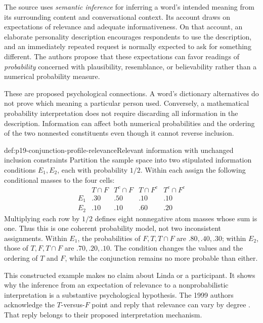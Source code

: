 The source uses \emph{semantic inference} for inferring a word's
intended meaning from its surrounding content and conversational
context. Its account draws on expectations of relevance and adequate
informativeness. On that account, an elaborate personality description
encourages respondents to use the description, and an immediately
repeated request is normally expected to ask for something different.
The authors propose that these expectations can favor readings of
\emph{probability} concerned with plausibility, resemblance, or
believability rather than a numerical probability measure.

These are proposed psychological connections. A word's dictionary
alternatives do not prove which meaning a particular person used.
Conversely, a mathematical probability interpretation does not require
discarding all information in the description. Information can affect
both numerical probabilities and the ordering of the two nonnested
constituents even though it cannot reverse inclusion.

\begin{hbexample}{def:p19-conjunction-profile-relevance}{Relevant information with unchanged inclusion constraints}
Partition the sample space into two stipulated information conditions
\(E_1,E_2\), each with probability \(1/2\). Within each assign the following
conditional masses to the four cells:
\[
\begin{array}{c|rrrr}
 &T\cap F&T^c\cap F&T\cap F^c&T^c\cap F^c\\ \hline
 E_1&.30&.50&.10&.10\\
 E_2&.10&.10&.60&.20
\end{array}
\]
Multiplying each row by \(1/2\) defines eight nonnegative atom masses
whose sum is one. Thus this is one coherent probability model, not
two inconsistent assignments.
Within \(E_1\), the probabilities of \(F,T,T\cap F\) are
\(.80,.40,.30\); within \(E_2\), those of \(T,F,T\cap F\)
are \(.70,.20,.10\). The condition changes the values and the
ordering of \(T\) and \(F\), while the conjunction remains no more
probable than either.

This constructed example makes no claim about Linda or a participant.
It shows why the inference from an expectation of relevance to a
nonprobabilistic interpretation is a substantive psychological
hypothesis. The 1999 authors acknowledge the \(T\)-versus-\(F\)
point and reply that relevance can vary by degree
\cite[p.~297]{HertwigGigerenzer1999Conjunction}.
That reply belongs to their proposed interpretation mechanism.
\end{hbexample}


